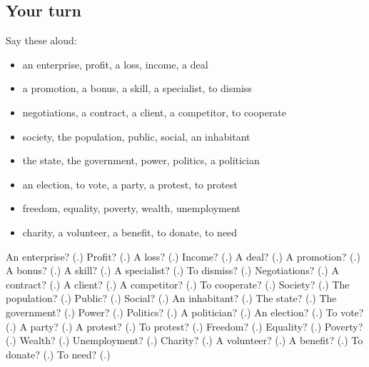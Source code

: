 \subsection*{Your turn}
Say these aloud:

\begin{itemize}
\raggedright
  \item an enterprise, profit, a loss, income, a deal
  \item a promotion, a bonus, a skill, a specialist, to dismiss
  \item negotiations, a contract, a client, a competitor, to cooperate
  \item society, the population, public, social, an inhabitant
  \item the state, the government, power, politics, a politician
  \item an election, to vote, a party, a protest, to protest
  \item freedom, equality, poverty, wealth, unemployment
  \item charity, a volunteer, a benefit, to donate, to need
\end{itemize}

\begin{tcolorbox}[breakable,colback=teal!4,colframe=teal!35!black,title={Before you move on}]
An enterprise? (\textbf{}.) Profit? (\textbf{}.) A loss? (\textbf{}.) Income? (\textbf{}.) A deal? (\textbf{}.) A promotion? (\textbf{}.) A bonus? (\textbf{}.) A skill? (\textbf{}.) A specialist? (\textbf{}.) To dismiss? (\textbf{}.) Negotiations? (\textbf{}.) A contract? (\textbf{}.) A client? (\textbf{}.) A competitor? (\textbf{}.) To cooperate? (\textbf{}.) Society? (\textbf{}.) The population? (\textbf{}.) Public? (\textbf{}.) Social? (\textbf{}.) An inhabitant? (\textbf{}.) The state? (\textbf{}.) The government? (\textbf{}.) Power? (\textbf{}.) Politics? (\textbf{}.) A politician? (\textbf{}.) An election? (\textbf{}.) To vote? (\textbf{}.) A party? (\textbf{}.) A protest? (\textbf{}.) To protest? (\textbf{}.) Freedom? (\textbf{}.) Equality? (\textbf{}.) Poverty? (\textbf{}.) Wealth? (\textbf{}.) Unemployment? (\textbf{}.) Charity? (\textbf{}.) A volunteer? (\textbf{}.) A benefit? (\textbf{}.) To donate? (\textbf{}.) To need? (\textbf{}.)
\end{tcolorbox}
